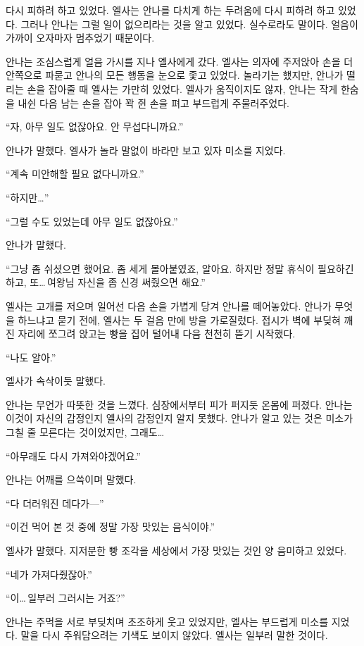 다시 피하려 하고 있었다. 엘사는 안나를 다치게 하는 두려움에 다시 피하려 하고 있었다. 그러나 안나는 그럴 일이 없으리라는 것을 알고 있었다. 실수로라도 말이다. 얼음이 가까이 오자마자 멈추었기 때문이다.

안나는 조심스럽게 얼음 가시를 지나 엘사에게 갔다. 엘사는 의자에 주저앉아 손을 더 안쪽으로 파묻고 안나의 모든 행동을 눈으로 좇고 있었다. 놀라기는 했지만, 안나가 떨리는 손을 잡아줄 때 엘사는 가만히 있었다. 엘사가 움직이지도 않자, 안나는 작게 한숨을 내쉰 다음 남는 손을 잡아 꽉 쥔 손을 펴고 부드럽게 주물러주었다.

``자, 아무 일도 없잖아요. 안 무섭다니까요.''

안나가 말했다. 엘사가 놀라 말없이 바라만 보고 있자 미소를 지었다.

``계속 미안해할 필요 없다니까요.''

``하지만\ldots''

``그럴 수도 있었는데 아무 일도 없잖아요.''

안나가 말했다.

``그냥 좀 쉬셨으면 했어요. 좀 세게 몰아붙였죠, 알아요. 하지만 정말 휴식이 필요하긴 하고, 또\ldots\,여왕님 자신을 좀 신경 써줬으면 해요.''

엘사는 고개를 저으며 일어선 다음 손을 가볍게 당겨 안나를 떼어놓았다. 안나가 무엇을 하느냐고 묻기 전에, 엘사는 두 걸음 만에 방을 가로질렀다. 접시가 벽에 부딪혀 깨진 자리에 쪼그려 앉고는 빵을 집어 털어내 다음 천천히 뜯기 시작했다.

``나도 알아.''

엘사가 속삭이듯 말했다.

안나는 무언가 따뜻한 것을 느꼈다. 심장에서부터 피가 퍼지듯 온몸에 퍼졌다. 안나는 이것이 자신의 감정인지 엘사의 감정인지 알지 못했다. 안나가 알고 있는 것은 미소가 그칠 줄 모른다는 것이었지만, 그래도\ldots

``아무래도 다시 가져와야겠어요.''

안나는 어깨를 으쓱이며 말했다.

``다 더러워진 데다가—''

``이건 먹어 본 것 중에 정말 가장 맛있는 음식이야.''

엘사가 말했다. 지저분한 빵 조각을 세상에서 가장 맛있는 것인 양 음미하고 있었다.

``네가 가져다줬잖아.''

``이\ldots\,일부러 그러시는 거죠?''

안나는 주먹을 서로 부딪치며 초조하게 웃고 있었지만, 엘사는 부드럽게 미소를 지었다. 말을 다시 주워담으려는 기색도 보이지 않았다. 엘사는 일부러 말한 것이다.

